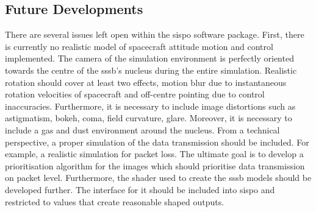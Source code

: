\subsection{Future Developments}
There are several issues left open within the \gls{sispo} software package. First, there is currently no realistic model of spacecraft attitude motion and control implemented. The camera of the simulation environment is perfectly oriented towards the centre of the \gls{sssb}'s nucleus during the entire simulation. Realistic rotation should cover at least two effects, motion blur due to instantaneous rotation velocities of spacecraft and off-centre pointing due to control inaccuracies. Furthermore, it is necessary to include  image distortions such as astigmatism, bokeh, coma, field curvature, glare. Moreover, it is necessary to include a gas and dust environment around the nucleus. From a technical perspective, a proper simulation of the data transmission should be included. For example, a realistic simulation for packet loss. The ultimate goal is to develop a prioritisation algorithm for the images which should prioritise data transmission on packet level.
Furthermore, the shader used to create the \gls{sssb} models should be developed further. The interface for it should be included into \gls{sispo} and restricted to values that create reasonable shaped outputs.